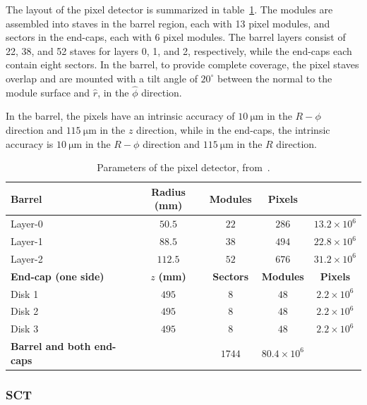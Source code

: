 The layout of the pixel detector is summarized in table~\ref{table:ATLAS-pixel-layout}.  The modules are assembled into staves in the barrel region, each with 13 pixel modules, and sectors in the end-caps, each with 6 pixel modules. The barrel layers consist of 22, 38, and 52 staves for layers 0, 1, and 2, respectively, while the end-caps each contain eight sectors. In the barrel, to provide complete coverage, the pixel staves overlap and are mounted with a tilt angle of $20^{\circ}$ between the normal to the module surface and $\hat{r}$, in the $\hat{\phi}$ direction. 

In the barrel, the pixels have an intrinsic accuracy of $\SI{10}{\micro\meter}$ in the $R-\phi$ direction and $\SI{115}{\micro\meter}$ in the $z$ direction, while in the end-caps, the intrinsic accuracy is $\SI{10}{\micro\meter}$ in the $R-\phi$ direction and $\SI{115}{\micro\meter}$ in the $R$ direction.

\begin{table}[htbp]
	\centering
	\begin{tabular}{|l|c|c|c|c|}
		\hline
		\textbf{Barrel} & \textbf{Radius (mm)} & \textbf{Modules} & \textbf{Pixels} \\
		\hline
		Layer-0 & $50.5$ & $22$ & $286$ & $13.2\times 10^6$ \\
		Layer-1 & $88.5$ & $38$ & $494$ & $22.8\times 10^6$ \\
		Layer-2 & $112.5$ & $52$ & $676$ & $31.2\times 10^6$ \\
		\hline
		\textbf{End-cap (one side)} & $z$ \textbf{(mm)} & \textbf{Sectors} & \textbf{Modules} & \textbf{Pixels} \\
		\hline
		Disk 1 & $495$ & $8$ & $48$ & $2.2\times 10^6$ \\
		Disk 2 & $495$ & $8$ & $48$ & $2.2\times 10^6$ \\
		Disk 3 & $495$ & $8$ & $48$ & $2.2\times 10^6$ \\
		\hline
		\textbf{Barrel and both end-caps} & & $1744$ & $80.4\times 10^6$ \\
		\hline
	\end{tabular}
	\caption{Parameters of the pixel detector, from~\cite{TheATLASCollaboration:2008fg}.}
	\label{table:ATLAS-pixel-layout}
\end{table}

\subsubsection{SCT}\label{sec:ATLAS-id-sct}

